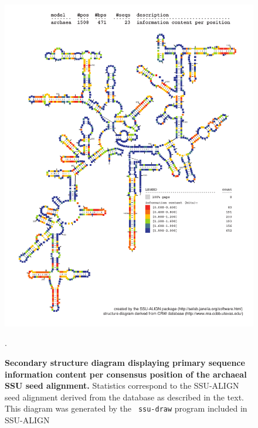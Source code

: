 \begin{figure}
\begin{center}
\includegraphics[width=5.7in]{Figures/archaea-0p1-info}
\end{center}
\caption[Secondary structure diagram displaying primary sequence
  information content per consensus position of the archaeal SSU seed
  alignment]{\textbf{Secondary structure diagram displaying primary
  sequence information content per consensus position of the archaeal SSU seed
  alignment.} Statistics correspond to the SSU-ALIGN seed
  alignment derived from the  database \cite{CannoneGutell02}
  as described in the text. This diagram was generated by the {\tt
  ssu-draw} program included in SSU-ALIGN}.
\label{fig:arcinfo}
\end{figure}

\newpage 

